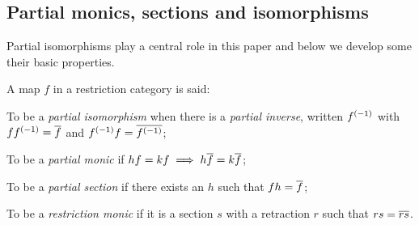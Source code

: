   \subsection{Partial monics, sections and isomorphisms} %
    \label{sub:restricted_monics_sections_and_partial_isomorphisms}

    Partial isomorphisms play a central role in this paper and below we develop
    some their basic properties.

    \begin{definition} 
      A map $f$ in a restriction category \X is said:
      \bi
        \item To be a \emph{partial isomorphism} when there is a \emph{partial inverse}, written 
          ${f}^{(-1)}$ with $f{f}^{(-1)} =\overline{f}$ and ${f}^{(-1)}f = \overline{{f}^{(-1)}}$;
        \item To be a \emph{partial monic} if $h f = k f \implies h \overline{f} = k \overline{f}$;
        \item To be a \emph{partial section} if there exists an  $h$ such that $f h = \overline{f}$;
        \item To be a \emph{restriction monic} if it is a section $s$ with a retraction
          $r$ such that $r s = \overline{r s}$.
      \ei
    \end{definition}

